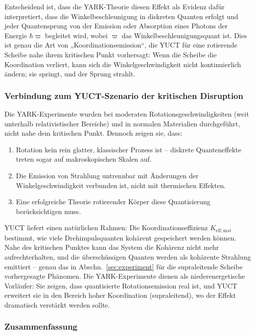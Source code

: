 \documentclass[12pt,a4paper]{article}
\begin{document}
	Entscheidend ist, dass die YARK-Theorie diesen Effekt als Evidenz dafür interpretiert, dass die Winkelbeschleunigung in diskreten Quanten erfolgt und jeder Quantensprung von der Emission oder Absorption eines Photons der Energie \(\hbar \varpi\) begleitet wird, wobei \(\varpi\) das Winkelbeschleunigungsquant ist. Dies ist genau die Art von „Koordinationsemission“, die YUCT für eine rotierende Scheibe nahe ihrem kritischen Punkt vorhersagt: Wenn die Scheibe die Koordination verliert, kann sich die Winkelgeschwindigkeit nicht kontinuierlich ändern; sie springt, und der Sprung strahlt.
	
	\subsubsection{Verbindung zum YUCT-Szenario der kritischen Disruption}
	
	Die YARK-Experimente wurden bei moderaten Rotationsgeschwindigkeiten (weit unterhalb relativistischer Bereiche) und in normalen Materialien durchgeführt, nicht nahe dem kritischen Punkt. Dennoch zeigen sie, dass:
	
	\begin{enumerate}
		\item Rotation kein rein glatter, klassischer Prozess ist – diskrete Quanteneffekte treten sogar auf makroskopischen Skalen auf.
		\item Die Emission von Strahlung untrennbar mit Änderungen der Winkelgeschwindigkeit verbunden ist, nicht mit thermischen Effekten.
		\item Eine erfolgreiche Theorie rotierender Körper diese Quantisierung berücksichtigen muss.
	\end{enumerate}
	
	YUCT liefert einen natürlichen Rahmen: Die Koordinationseffizienz \(K_{\mathrm{eff,mat}}\) bestimmt, wie viele Drehimpulsquanten kohärent gespeichert werden können. Nahe des kritischen Punktes kann das System die Kohärenz nicht mehr aufrechterhalten, und die überschüssigen Quanten werden als kohärente Strahlung emittiert – genau das in Abschn.~\ref{sec:experiment} für die supraleitende Scheibe vorhergesagte Phänomen. Die YARK-Experimente dienen als niederenergetische Vorläufer: Sie zeigen, dass quantisierte Rotationsemission real ist, und YUCT erweitert sie in den Bereich hoher Koordination (supraleitend), wo der Effekt dramatisch verstärkt werden sollte.
	
	\subsubsection{Zusammenfassung}
	
\end{document}
